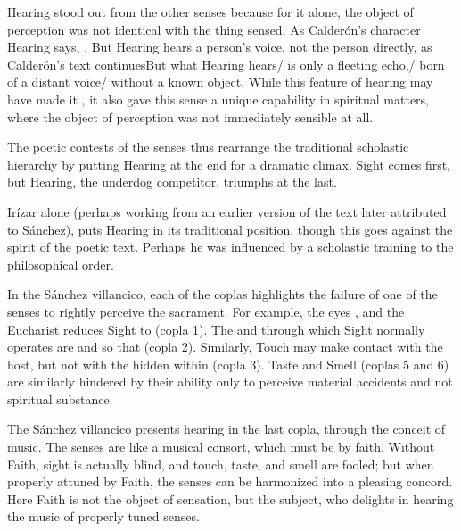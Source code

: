 Hearing stood out from the other senses because for it alone, the object of
perception was not identical with the thing sensed.
As Calderón's character Hearing says, .%
    \Autocite[]{Calderon:Retiro}
But Hearing hears a person's voice, not the person directly, as Calderón's text
continues{But what Hearing hears/ is only a fleeting echo,/ born of a
distant voice/ without a known object}.%
    \Autocite[]{Calderon:Retiro}
While this feature of hearing may have made it , it also
gave this sense a unique capability in spiritual matters, where the object of
perception was not immediately sensible at all.

The poetic contests of the senses thus rearrange the traditional scholastic
hierarchy by putting Hearing at the end for a dramatic climax.
Sight comes first, but Hearing, the underdog competitor, triumphs at the
last.
\begin{Footnote}
    Irízar alone (perhaps working from an earlier version of the text later
    attributed to Sánchez), puts Hearing in its traditional position, though
    this goes against the spirit of the poetic text.  
    Perhaps he was influenced by a scholastic training to  the
    philosophical order.
\end{Footnote}
In the Sánchez villancico, each of the coplas highlights the failure of one of
the senses to rightly perceive the sacrament.
For example, the eyes , and the Eucharist
reduces Sight to  (copla 1).
The  and  through which Sight normally
operates are   and
 so that  (copla 2).
Similarly, Touch may make contact with the host, but not with the
 hidden within (copla 3).
Taste and Smell (coplas 5 and 6) are similarly hindered by their ability only to
perceive material accidents and not spiritual substance.

The Sánchez villancico presents hearing in the last copla, through the conceit
of music.
The senses are  like a musical consort, which must be
 by faith.
Without Faith, sight is actually blind, and touch, taste, and smell are fooled;
but when properly attuned by Faith, the senses can be harmonized into a pleasing
concord.
Here Faith is not the object of sensation, but the subject, who delights in
hearing the music of properly tuned senses.

